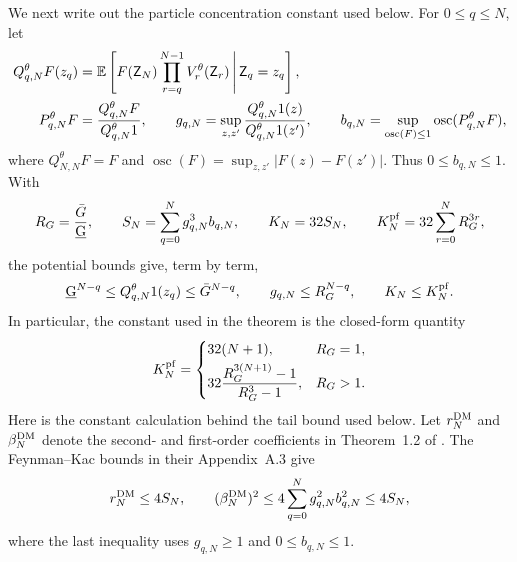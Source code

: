 We next write out the particle concentration constant used below.  For
$0\leq q\leq N$, let
\begin{align}
Q_{q,N}^\theta F(z_q)
 &=\mathbb{E}\left[
   F(\mathsf Z_N)\prod_{r=q}^{N-1}V_r^\theta(\mathsf Z_r)
   \,\middle|\,\mathsf Z_q=z_q
   \right],                                                     \label{eq:s2-q-semigroup}\\
P_{q,N}^\theta F
 &=\frac{Q_{q,N}^\theta F}{Q_{q,N}^\theta1},\qquad
g_{q,N}=\sup_{z,z'}
 \frac{Q_{q,N}^\theta1(z)}{Q_{q,N}^\theta1(z')},\qquad
b_{q,N}=\sup_{\operatorname{osc}(F)\leq1}
 \operatorname{osc}(P_{q,N}^\theta F),                         \label{eq:s2-semigroup-constants}
\end{align}
where $Q_{N,N}^\theta F=F$ and
$\operatorname{osc}(F)=\sup_{z,z'}|F(z)-F(z')|$.  Thus
$0\leq b_{q,N}\leq1$.  With
\begin{equation}
R_G=\frac{\bar G}{\underbar G},\qquad
S_N=\sum_{q=0}^Ng_{q,N}^3b_{q,N},\qquad K_N=32S_N,\qquad
K_N^{\rm pf}=32\sum_{r=0}^NR_G^{3r},                           \label{eq:s2-explicit-constant}
\end{equation}
the potential bounds give, term by term,
\begin{equation}
\underbar G^{N-q}\leq Q_{q,N}^\theta1(z_q)
 \leq\bar G^{N-q},\qquad
g_{q,N}\leq R_G^{N-q},\qquad K_N\leq K_N^{\rm pf}.             \label{eq:s2-explicit-constant-bound}
\end{equation}
In particular, the constant used in the theorem is the closed-form quantity
\begin{equation}
K_N^{\rm pf}=
\begin{cases}
32(N+1),&R_G=1,\\[1mm]
\displaystyle 32\frac{R_G^{3(N+1)}-1}{R_G^3-1},&R_G>1.
\end{cases}                                                     \label{eq:s2-explicit-constant-closed}
\end{equation}
Here is the constant calculation behind the tail bound used below.  Let
$r_N^{\rm DM}$ and $\beta_N^{\rm DM}$ denote the second- and first-order
coefficients in Theorem~1.2 of \citet{delMoral11}.  The Feynman--Kac bounds in
their Appendix~A.3 give
\begin{equation}
r_N^{\rm DM}\leq4S_N,
\qquad
(\beta_N^{\rm DM})^2
 \leq4\sum_{q=0}^Ng_{q,N}^2b_{q,N}^2
 \leq4S_N,                                                       \label{eq:s2-dm-coefficient-bounds}
\end{equation}
where the last inequality uses $g_{q,N}\geq1$ and $0\leq b_{q,N}\leq1$.
